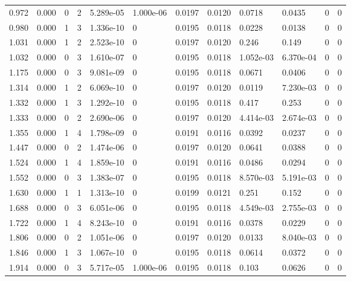 \documentclass[preview]{standalone}
\begin{document}
{{\begin{tabular}{L{1.2cm}C{1.2cm} C{0.3cm}C{0.5cm} C{1.4cm}C{1.4cm} C{1.4cm}C{1.4cm} C{1.6cm}C{1.6cm} C{1.6cm}C{1.6cm}}
  0.972  &  0.000  & 0     &  2 &  5.289e-05  & 1.000e-06  &  0.0197&   0.0120& 0.0718 & 0.0435   &  0 & 0  \\ 
  0.980  &  0.000  & 1     &  3 &  1.336e-10  & 0  &  0.0195&   0.0118& 0.0228 & 0.0138   &  0 & 0  \\ 
  1.031  &  0.000  & 1     &  2 &  2.523e-10  & 0  &  0.0197&   0.0120& 0.246 & 0.149   &  0 & 0  \\ 
  1.032  &  0.000  & 0     &  3 &  1.610e-07  & 0  &  0.0195&   0.0118& 1.052e-03 & 6.370e-04   &  0 & 0  \\ 
  1.175  &  0.000  & 0     &  3 &  9.081e-09  & 0  &  0.0195&   0.0118& 0.0671 & 0.0406   &  0 & 0  \\ 
  1.314  &  0.000  & 1     &  2 &  6.069e-10  & 0  &  0.0197&   0.0120& 0.0119 & 7.230e-03   &  0 & 0  \\ 
  1.332  &  0.000  & 1     &  3 &  1.292e-10  & 0  &  0.0195&   0.0118& 0.417 & 0.253   &  0 & 0  \\ 
  1.333  &  0.000  & 0     &  2 &  2.690e-06  & 0  &  0.0197&   0.0120& 4.414e-03 & 2.674e-03   &  0 & 0  \\ 
  1.355  &  0.000  & 1     &  4 &  1.798e-09  & 0  &  0.0191&   0.0116& 0.0392 & 0.0237   &  0 & 0  \\ 
  1.447  &  0.000  & 0     &  2 &  1.474e-06  & 0  &  0.0197&   0.0120& 0.0641 & 0.0388   &  0 & 0  \\ 
  1.524  &  0.000  & 1     &  4 &  1.859e-10  & 0  &  0.0191&   0.0116& 0.0486 & 0.0294   &  0 & 0  \\ 
  1.552  &  0.000  & 0     &  3 &  1.383e-07  & 0  &  0.0195&   0.0118& 8.570e-03 & 5.191e-03   &  0 & 0  \\ 
  1.630  &  0.000  & 1     &  1 &  1.313e-10  & 0  &  0.0199&   0.0121& 0.251 & 0.152   &  0 & 0  \\ 
  1.688  &  0.000  & 0     &  3 &  6.051e-06  & 0  &  0.0195&   0.0118& 4.549e-03 & 2.755e-03   &  0 & 0  \\ 
  1.722  &  0.000  & 1     &  4 &  8.243e-10  & 0  &  0.0191&   0.0116& 0.0378 & 0.0229   &  0 & 0  \\ 
  1.806  &  0.000  & 0     &  2 &  1.051e-06  & 0  &  0.0197&   0.0120& 0.0133 & 8.040e-03   &  0 & 0  \\ 
  1.846  &  0.000  & 1     &  3 &  1.067e-10  & 0  &  0.0195&   0.0118& 0.0614 & 0.0372   &  0 & 0  \\ 
  1.914  &  0.000  & 0     &  3 &  5.717e-05  & 1.000e-06  &  0.0195&   0.0118& 0.103 & 0.0626   &  0 & 0  \\ 

\end{tabular}}}
\end{document}
